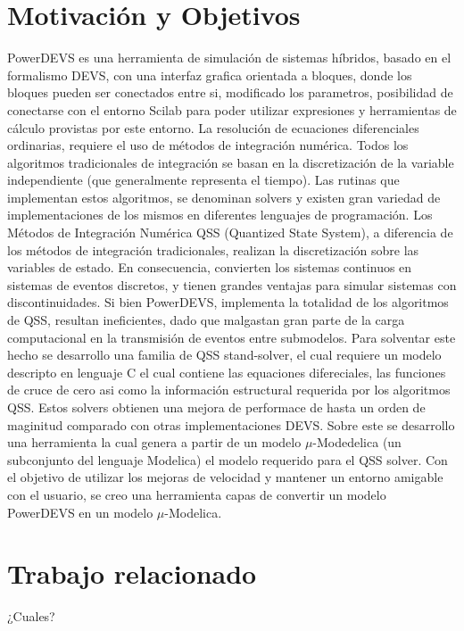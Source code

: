 \documentclass[a4paper,	11pt]{report}
\begin{document}
\section{Motivación y Objetivos}
PowerDEVS es una herramienta de simulación de sistemas híbridos, basado en el formalismo DEVS, con una interfaz grafica orientada a bloques, donde los bloques pueden ser conectados entre si, modificado los parametros, posibilidad de conectarse con el entorno Scilab para poder utilizar expresiones y herramientas de cálculo provistas por este entorno.
La resolución de ecuaciones diferenciales ordinarias, requiere el uso de métodos de integración numérica. Todos los algoritmos tradicionales de integración se basan en la discretización de la variable independiente (que generalmente representa el tiempo). Las rutinas que implementan estos algoritmos, se denominan solvers y existen gran variedad de implementaciones de los mismos en diferentes lenguajes de programación. Los Métodos de Integración Numérica QSS (Quantized State System), a diferencia de los métodos de integración tradicionales, realizan la discretización sobre las variables de estado. En consecuencia, convierten los sistemas continuos en sistemas de eventos discretos, y tienen grandes ventajas para simular sistemas con discontinuidades.
Si bien PowerDEVS, implementa la totalidad de los algoritmos de QSS, resultan ineficientes, dado que malgastan gran parte de la carga computacional en la transmisión de eventos entre submodelos.
Para solventar este hecho se desarrollo una familia de QSS stand-solver, el cual requiere un modelo descripto en lenguaje C el cual contiene las equaciones difereciales, las funciones de cruce de cero asi como la información estructural requerida por los algoritmos QSS. Estos solvers obtienen una mejora de performace de hasta un orden de maginitud comparado con otras implementaciones DEVS.
Sobre este se desarrollo una herramienta la cual genera a partir de un modelo $\mu$-Modedelica (un subconjunto del lenguaje Modelica) el modelo requerido para el QSS solver.
Con el objetivo de utilizar los mejoras de velocidad y mantener un entorno amigable con el usuario, se creo una herramienta capas de convertir un modelo PowerDEVS en un modelo $\mu$-Modelica.


\section{Trabajo relacionado}
¿Cuales?
\end{document}
